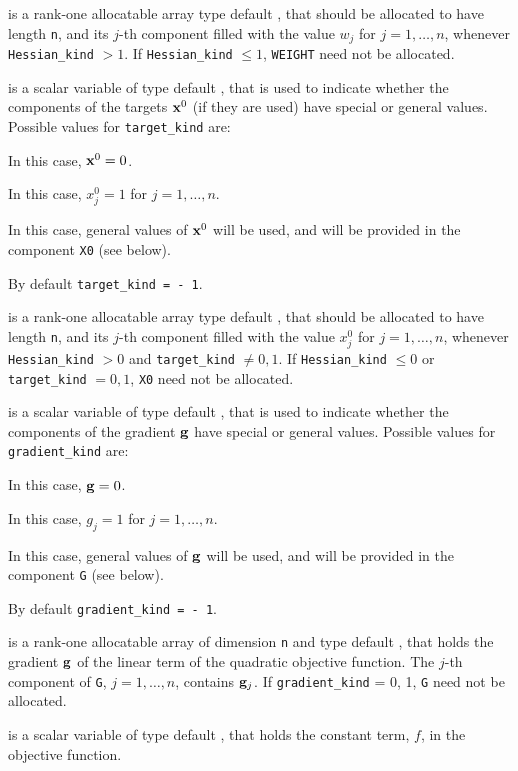 \documentclass{galahad}
\begin{document}
\begin{description}
 is a rank-one allocatable array type default \realdp, that 
should be allocated to have length {\tt n}, and its $j$-th component 
filled with the value $w_{j}$ for $j = 1, \ldots , n$, 
whenever {\tt Hessian\_kind} $>1$.
If {\tt Hessian\_kind} $\leq 1$, {\tt WEIGHT} need not be allocated.

 is a scalar variable of type default \integer, 
that is used to indicate whether the components of the targets ${\mathbf{x}}^0$ 
(if they are used) have special or general values. Possible values for 
{\tt target\_kind} are:
\begin{description}
  In this case, ${\mathbf{x}}^0 = 0$.

 In this case, $x^0_{j} = 1$ for $j = 1, \ldots , n$.

 In this case, general values of ${\mathbf{x}}^0$ will be used,
     and will be provided in the component {\tt X0} (see below).
\end{description}
By default {\tt target\_kind = - 1}.

 is a rank-one allocatable array type default \realdp, that 
should be allocated to have length {\tt n}, and its $j$-th component 
filled with the value $x_{j}^0$ for $j = 1, \ldots , n$, 
whenever {\tt Hessian\_kind} $>0$ and {\tt target\_kind} $\neq 0,1$.
If {\tt Hessian\_kind} $\leq 0$ or {\tt target\_kind} $= 0,1$,
{\tt X0} need not be allocated.

 is a scalar variable of type default \integer, 
that is used to indicate whether the components of the gradient ${\mathbf{g}}$ 
have special or general values. Possible values for {\tt gradient\_kind} are:
\begin{description}
  In this case, ${\mathbf{g}} = 0$.

 In this case, $g_{j} = 1$ for $j = 1, \ldots , n$.

 In this case, general values of ${\mathbf{g}}$ will be used,
     and will be provided in the component {\tt G} (see below).
\end{description}
By default {\tt gradient\_kind = - 1}.

 is a rank-one allocatable array of dimension {\tt n} and type 
default \realdp, that holds the gradient ${\mathbf{g}}$ 
of the linear term of the quadratic objective function.
The $j$-th component of 
{\tt G}, $j = 1,  \ldots ,  n$, contains ${\mathbf{g}}_{j}$.
If {\tt gradient\_kind} {= 0, 1}, {\tt G} need not be allocated.

 is a scalar variable of type default \realdp, that holds 
the constant term, $f$, in the objective function.


\end{description}
\end{document}
